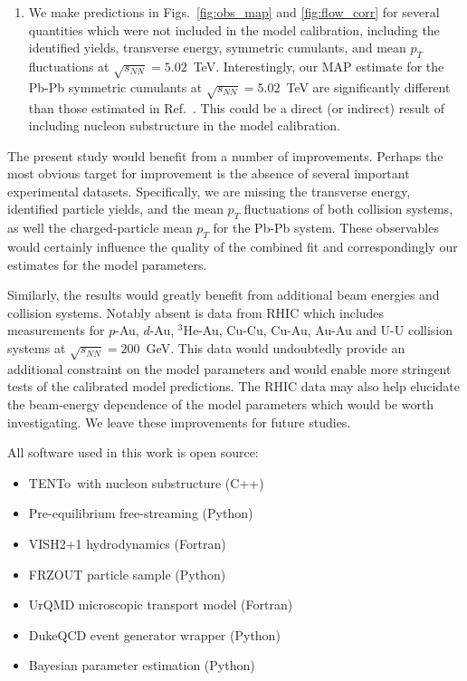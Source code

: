 \documentclass[aps,prc,reprint,amsmath,nofootinbib]{revtex4-1}
\newcommand{\trento}{T\raisebox{-0.5ex}{R}ENTo}
\newcommand{\sqrts}{\sqrt{s_{NN}}}
\begin{document}
\begin{enumerate}[itemsep=0pt, leftmargin=2\parindent]
  \item
    We make predictions in Figs.~\ref{fig:obs_map} and \ref{fig:flow_corr} for several quantities which were not included in the model calibration, including the identified yields, transverse energy, symmetric cumulants, and mean $p_T$ fluctuations at $\sqrts=5.02$~TeV.
    Interestingly, our MAP estimate for the Pb-Pb symmetric cumulants at $\sqrts=5.02$~TeV are significantly different than those estimated in Ref.~\cite{Bernhard:2018hnz}.
    This could be a direct (or indirect) result of including nucleon substructure in the model calibration.
\end{enumerate}

The present study would benefit from a number of improvements.
Perhaps the most obvious target for improvement is the absence of several important experimental datasets.
Specifically, we are missing the transverse energy, identified particle yields, and the mean $p_T$ fluctuations of both collision systems, as well the charged-particle mean $p_T$ for the Pb-Pb system.
These observables would certainly influence the quality of the combined fit and correspondingly our estimates for the model parameters.

Similarly, the results would greatly benefit from additional beam energies and collision systems.
Notably absent is data from RHIC which includes measurements for $p$-Au, $d$-Au, $^3$He-Au, Cu-Cu, Cu-Au, Au-Au and \mbox{U-U} collision systems at $\sqrts=200$~GeV.
This data would undoubtedly provide an additional constraint on the model parameters and would enable more stringent tests of the calibrated model predictions.
The RHIC data may also help elucidate the beam-energy dependence of the model parameters which would be worth investigating.
We leave these improvements for future studies.

\medskip

All software used in this work is open source:
\begin{itemize}[leftmargin=2\parindent, itemsep=0pt, topsep=5pt]
  \item \trento\ with nucleon substructure (C++) \cite{trento:code}
  \item Pre-equilibrium free-streaming (Python) \cite{freestream:code}
  \item VISH2+1 hydrodynamics (Fortran) \cite{osuhydro:code}
  \item FRZOUT particle sample (Python) \cite{frzout:code}
  \item UrQMD microscopic transport model (Fortran) \cite{urqmd:code}
  \item DukeQCD event generator wrapper (Python) \cite{eventgen:code}
  \item Bayesian parameter estimation (Python) \cite{bayesian:code}
\end{itemize}
\end{document}
